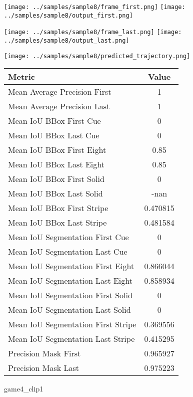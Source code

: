 \begin{figure}
\texttt{[image: ../samples/sample8/frame\_first.png]}
\texttt{[image: ../samples/sample8/output\_first.png]}\par
\texttt{[image: ../samples/sample8/frame\_last.png]}
\texttt{[image: ../samples/sample8/output\_last.png]}\par
\centering
\texttt{[image: ../samples/sample8/predicted\_trajectory.png]}
\caption{game4\_clip1}
\vspace{10pt}
\begin{tabular}{|l|c|}
\hline
\textbf{Metric} & \textbf{Value} \\
\hline
Mean Average Precision First & 1 \\
Mean Average Precision Last & 1 \\
\hline
Mean IoU BBox First Cue & 0 \\
Mean IoU BBox Last Cue & 0 \\
Mean IoU BBox First Eight & 0.85 \\
Mean IoU BBox Last Eight & 0.85 \\
Mean IoU BBox First Solid & 0 \\
Mean IoU BBox Last Solid & -nan \\
Mean IoU BBox First Stripe & 0.470815 \\
Mean IoU BBox Last Stripe & 0.481584 \\
\hline
Mean IoU Segmentation First Cue & 0 \\
Mean IoU Segmentation Last Cue & 0 \\
Mean IoU Segmentation First Eight & 0.866044 \\
Mean IoU Segmentation Last Eight & 0.858934 \\
Mean IoU Segmentation First Solid & 0 \\
Mean IoU Segmentation Last Solid & 0 \\
Mean IoU Segmentation First Stripe & 0.369556 \\
Mean IoU Segmentation Last Stripe & 0.415295 \\
\hline
Precision Mask First & 0.965927 \\
Precision Mask Last & 0.975223 \\
\hline
\end{tabular}
\end{figure}

